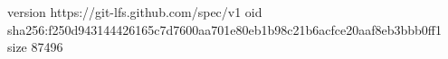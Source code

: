 version https://git-lfs.github.com/spec/v1
oid sha256:f250d943144426165c7d7600aa701e80eb1b98c21b6acfce20aaf8eb3bbb0ff1
size 87496
